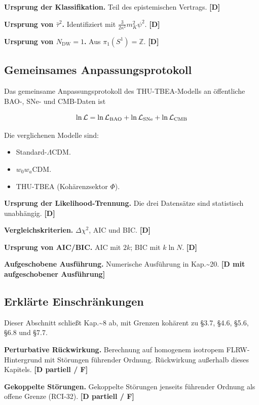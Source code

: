 ﻿\documentclass[11pt,letterpaper]{article}
\begin{document}
\textbf{Ursprung der Klassifikation.} Teil des epistemischen Vertrags. \textbf{[D]}

\textbf{Ursprung von $\bar\tau^2$.} Identifiziert mit $\frac{3}{2\kappa^2}m_K^2\psi^2$. \textbf{[D]}

\textbf{Ursprung von $N_{\text{DW}} = 1$.} Aus $\pi_1(S^1) = \mathbb{Z}$. \textbf{[D]}
\subsection{Gemeinsames Anpassungsprotokoll}
Das gemeinsame Anpassungsprotokoll des THU-TBEA-Modells an öffentliche BAO-, SNe- und CMB-Daten ist

\begin{equation*}
  \resizebox{\ifdim\width>\linewidth \linewidth\else\width\fi}{!}{$\displaystyle \ln\mathcal{L} = \ln\mathcal{L}_{\text{BAO}} + \ln\mathcal{L}_{\text{SNe}} + \ln\mathcal{L}_{\text{CMB}}$}
\end{equation*}

Die verglichenen Modelle sind:

\begin{itemize}[leftmargin=*]
\item Standard-$\Lambda$CDM.
\item $w_0w_a$CDM.
\item THU-TBEA (Kohärenzsektor $\Phi$).
\end{itemize}

\textbf{Ursprung der Likelihood-Trennung.} Die drei Datensätze sind statistisch unabhängig. \textbf{[D]}

\textbf{Vergleichskriterien.} $\Delta\chi^2$, AIC und BIC. \textbf{[D]}

\textbf{Ursprung von AIC/BIC.} AIC mit $2k$; BIC mit $k\ln N$. \textbf{[D]}

\textbf{Aufgeschobene Ausführung.} Numerische Ausführung in Kap.\textasciitilde{}20. \textbf{[D mit aufgeschobener Ausführung]}
\subsection{Erklärte Einschränkungen}
Dieser Abschnitt schließt Kap.\textasciitilde{}8 ab, mit Grenzen kohärent zu §3.7, §4.6, §5.6, §6.8 und §7.7.

\textbf{Perturbative Rückwirkung.} Berechnung auf homogenem isotropem FLRW-Hintergrund mit Störungen führender Ordnung. Rückwirkung außerhalb dieses Kapitels. \textbf{[D partiell / F]}

\textbf{Gekoppelte Störungen.} Gekoppelte Störungen jenseits führender Ordnung als offene Grenze (RCI-32). \textbf{[D partiell / F]}
\end{document}

